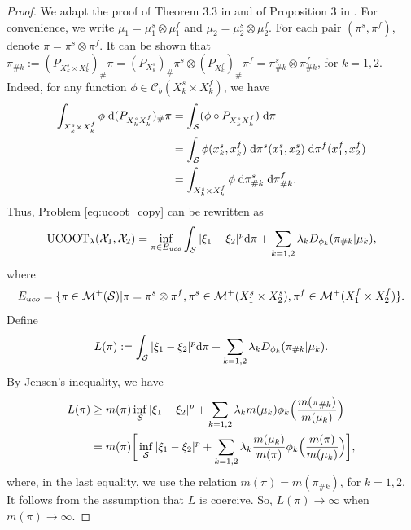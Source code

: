 \begin{proof}
  We adapt the proof of Theorem 3.3 in \citep{Liero18} and of Proposition 3 in \citep{Sejourne20}.
  For convenience, we write $\mu_1 = \mu_1^s \otimes \mu_1^f$ and
  $\mu_2 = \mu_2^s \otimes \mu_2^f$. For each pair $(\pi^s, \pi^f)$, denote
  $\pi = \pi^s \otimes \pi^f$.
  It can be shown that
  $\pi_{\# k} := (P_{X_k^s \times X_k^f})_{\#} \pi
  = (P_{X_k^s})_{\#} \pi^s \otimes (P_{X_k^f})_{\#} \pi^f =
  \pi^s_{\# k} \otimes \pi^f_{\# k}$, for $k=1,2$. Indeed, for any function
  $\phi \in \mathcal C_b(X_k^s \times X_k^f)$, we have
    \begin{equation}
      \begin{split}
        \int_{X_k^s \times X_k^f} \phi \;
        \mathrm d (P_{X_k^s X_k^f})_{\#} \pi
        &= \int_{\mathcal S} (\phi \circ P_{X_k^s X_k^f}) \; \mathrm d\pi \\
        &= \int_{\mathcal S} \phi(x_k^s, x_k^f)
        \; \mathrm d \pi^s(x_1^s, x_2^s) \; \mathrm d \pi^f(x_1^f, x_2^f) \\
        &= \int_{X_k^s \times X_k^f} \phi \; \mathrm d \pi^s_{\# k} \;
        \mathrm d \pi^f_{\# k}.
      \end{split}
    \end{equation}
  Thus, Problem \eqref{eq:ucoot_copy} can be rewritten as
  \begin{equation}
    \text{UCOOT}_{\lambda}(\mathcal X_1, \mathcal X_2) =
    \inf_{\pi \in E_{uco}} \int_{\mathcal S} \vert \xi_1 - \xi_2 \vert^p
    \mathrm d\pi + \sum_{k=1,2} \lambda_k D_{\phi_k}(\pi_{\# k} \vert \mu_k),
  \end{equation}
  where
  \begin{equation}
    E_{uco} = \{ \pi \in \mathcal M^+(\mathcal S) \vert \pi = \pi^s \otimes \pi^f,
    \pi^s \in \mathcal M^+(X_1^s \times X_2^s),
    \pi^f \in \mathcal M^+(X_1^f \times X_2^f) \}.
  \end{equation}
  Define
  \begin{equation}
    L(\pi):= \int_{\mathcal S} \vert \xi_1 - \xi_2 \vert^p \mathrm d \pi +
    \sum_{k=1,2} \lambda_k D_{\phi_k}(\pi_{\# k} \vert \mu_k).
  \end{equation}
  By Jensen's inequality, we have
  \begin{equation}
    \begin{split}
      L(\pi) &\geq m(\pi) \inf_{\mathcal S} \vert \xi_1 - \xi_2 \vert^p +
      \sum_{k=1,2} \lambda_k m(\mu_k) \phi_k \Big( \frac{m(\pi_{\# k})}{m(\mu_k)} \Big) \\
      &= m(\pi) \bigg[ \inf_{\mathcal S} \vert \xi_1 - \xi_2 \vert^p +
      \sum_{k=1,2} \lambda_k \frac{m(\mu_k)}{m(\pi)} \phi_k
      \Big( \frac{m(\pi)}{m(\mu_k)} \Big) \bigg],
    \end{split}
  \end{equation}
  where, in the last equality, we use the relation $m(\pi) = m(\pi_{\# k})$, for $k=1,2$.
  It follows from the assumption that $L$ is coercive. So, $L(\pi) \to \infty$
  when $m(\pi) \to \infty$.


\end{proof}
